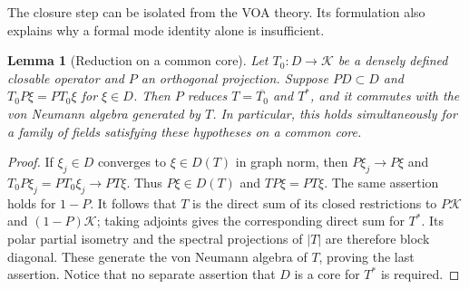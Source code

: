 \documentclass[11pt,a4paper]{article}
\newtheorem{lemma}[theorem]{Lemma}
\theoremstyle{definition}
\begin{document}
The closure step can be isolated from the VOA theory.  Its formulation
also explains why a formal mode identity alone is insufficient.

\begin{lemma}[Reduction on a common core]
\label{lem:analytic-graph-reduction}
Let $T_0:D\to\mathcal K$ be a densely defined closable operator and
$P$ an orthogonal projection.  Suppose $PD\subset D$ and
$T_0P\xi=PT_0\xi$ for $\xi\in D$.  Then $P$ reduces
$T=\overline{T_0}$ and $T^*$, and it commutes with the von Neumann
algebra generated by $T$.  In particular, this holds simultaneously
for a family of fields satisfying these hypotheses on a common core.
\end{lemma}
\begin{proof}
If $\xi_j\in D$ converges to $\xi\in D(T)$ in graph norm, then
$P\xi_j\to P\xi$ and $T_0P\xi_j=PT_0\xi_j\to PT\xi$.
Thus $P\xi\in D(T)$ and $TP\xi=PT\xi$.  The same assertion holds
for $1-P$.  It follows that $T$ is the direct sum of its closed
restrictions to $P\mathcal K$ and $(1-P)\mathcal K$; taking adjoints
gives the corresponding direct sum for $T^*$.  Its polar partial
isometry and the spectral projections of $|T|$ are therefore block
diagonal.  These generate the von Neumann algebra of $T$, proving the
last assertion.  Notice that no separate assertion that $D$ is a core
for $T^*$ is required.
\end{proof}
\end{document}
